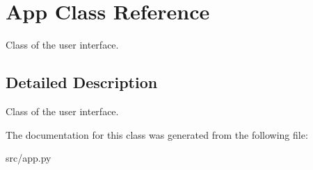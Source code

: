 \hypertarget{class_app}{}\section{App Class Reference}
\label{class_app}


Class of the user interface.  




\subsection{Detailed Description}
Class of the user interface. 



The documentation for this class was generated from the following file\+:\begin{DoxyCompactItemize}
\item 
src/app.\+py\end{DoxyCompactItemize}
